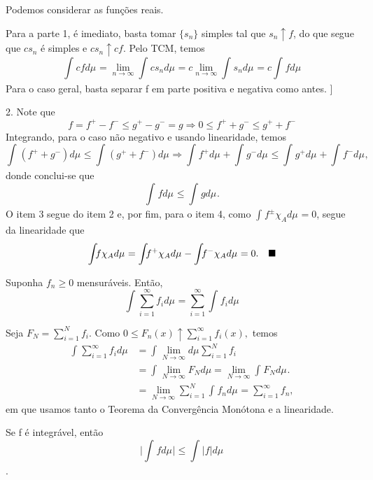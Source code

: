 \documentclass[MeasureTheory/measure_theory.tex]{subfiles}
\begin{document}
\begin{proof*}
	Podemos considerar as funções reais.

	Para a parte 1, é imediato, basta tomar \(\{s_{n}\}\) simples tal que \(s_{n}\uparrow f\), do que segue que \(cs_{n}\) é simples e \(cs_{n}\uparrow cf.\)
	Pelo TCM, temos
	\[
		\int_{}cf d\mu_{} = \lim_{n\to \infty}\int_{}cs_{n} d\mu_{} = c \lim_{n\to \infty}\int_{}s_{n} d\mu_{} = c \int_{}f d\mu_{}
	\]
	Para o caso geral, basta separar f em parte positiva e negativa como antes. ]

	2. Note que
	\[
		f = f^{+} - f^{-} \leq g^{+} - g^{-} = g \Rightarrow  0 \leq f^{+} + g^{-} \leq g^{+} + f^{-}
	\]
	Integrando, para o caso não negativo e usando linearidade, temos
	\[
		\int_{}(f^{+} + g^{-}) d\mu_{} \leq \int_{}(g^{+}+f^{-}) d\mu_{} \Rightarrow \int_{}f^{+} d\mu_{} + \int_{}g^{-} d\mu_{} \leq \int_{}g^{+} d\mu_{} + \int_{} f^{-} d\mu_{},
	\]
	donde conclui-se que
	\[
		\int_{}f d\mu_{} \leq \int_{}g d\mu_{}.
	\]
	O item 3 segue do item 2 e, por fim, para o item 4, como \(\int_{}f^{\pm}\chi_{A} d\mu_{} = 0\), segue da linearidade que
	\[
		\int_{}f \chi_{A} d\mu_{} = \int_{}f^{+}\chi_{A} d\mu_{} - \int_{}f^{-}\chi_{A} d\mu_{} = 0. \quad \text{$\blacksquare$}
	\]
\end{proof*}
\begin{prop*}
	Suponha \(f_{n}\geq 0\) mensuráveis. Então,
	\[
		\int_{}\sum\limits_{i=1}^{\infty}f_{i} d\mu_{} = \sum\limits_{i=1}^{\infty}\int_{}f_{i} d\mu_{}
	\]
\end{prop*}
\begin{proof*}
	Seja \(F_{N} = \sum\limits_{i=1}^{N}f_{i}.\) Como \(0 \leq F_{n}(x)\uparrow \sum\limits_{i=1}^{\infty}f_{i}(x),\) temos
	\begin{align*}
		\int_{}\sum\limits_{i=1}^{\infty}f_{i} d\mu_{} & = \int_{}\lim_{N\to \infty} d\mu_{} \sum\limits_{i=1}^{N}f_{i}                                   \\
		                                               & = \int_{}^{}\lim_{N\to \infty}F_{N}d\mu  = \lim_{N\to \infty}\int_{}F_{N} d\mu_{}.               \\
		                                               & = \lim_{N\to \infty}\sum\limits_{i=1}^{N}\int_{}f_{n} d\mu_{} = \sum\limits_{i=1}^{\infty}f_{n},
	\end{align*}
	em que usamos tanto o Teorema da Convergência Monótona e a linearidade. \qedsymbol
\end{proof*}
\begin{prop*}
	Se f é integrável, então
	\[
		\biggl\vert \int_{}f d\mu_{} \biggr\vert \leq \int_{}|f| d\mu_{}
	\].
\end{prop*}
\end{document}

